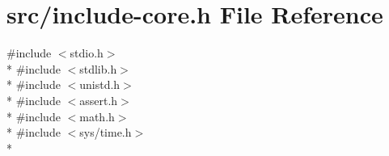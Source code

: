 \hypertarget{include-core_8h}{}\section{src/include-\/core.h File Reference}
\label{include-core_8h}
{\ttfamily \#include $<$stdio.\+h$>$}\\*
{\ttfamily \#include $<$stdlib.\+h$>$}\\*
{\ttfamily \#include $<$unistd.\+h$>$}\\*
{\ttfamily \#include $<$assert.\+h$>$}\\*
{\ttfamily \#include $<$math.\+h$>$}\\*
{\ttfamily \#include $<$sys/time.\+h$>$}\\*
